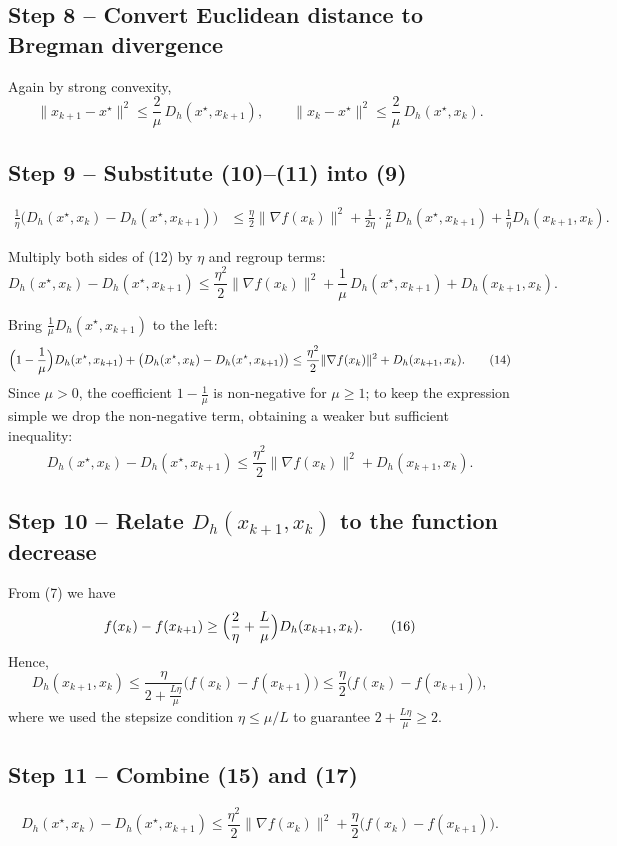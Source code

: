 \documentclass{article}
\newcommand{\grad}{\nabla}
\newcommand{\Breg}{D_h}
\begin{document}
\subsection*{Step 8 – Convert Euclidean distance to Bregman divergence}
Again by strong convexity,
\[
\|x_{k+1}-x^\star\|^{2}\le\frac{2}{\mu}\,\Breg(x^\star,x_{k+1}),
\qquad
\|x_{k}-x^\star\|^{2}\le\frac{2}{\mu}\,\Breg(x^\star,x_{k}).
\tag{11}
\]

\subsection*{Step 9 – Substitute (10)–(11) into (9)}
\[
\begin{aligned}
\frac{1}{\eta}\bigl(\Breg(x^\star,x_k)-\Breg(x^\star,x_{k+1})\bigr)
&\le
\frac{\eta}{2}\|\grad f(x_k)\|^{2}
   +\frac{1}{2\eta}\cdot\frac{2}{\mu}\,\Breg(x^\star,x_{k+1})
   +\frac{1}{\eta}\Breg(x_{k+1},x_k) .
\end{aligned}
\tag{12}
\]

Multiply both sides of (12) by $\eta$ and regroup terms:
\[
\Breg(x^\star,x_k)-\Breg(x^\star,x_{k+1})
\le
\frac{\eta^{2}}{2}\|\grad f(x_k)\|^{2}
   +\frac{1}{\mu}\,\Breg(x^\star,x_{k+1})
   +\Breg(x_{k+1},x_k).
\tag{13}
\]

Bring $\frac{1}{\mu}\Breg(x^\star,x_{k+1})$ to the left:
\[
\Bigl(1-\frac{1}{\mu}\Bigr)\Breg(x^\star,x_{k+1})
+\bigl(\Breg(x^\star,x_k)-\Breg(x^\star,x_{k+1})\bigr)
\le
\frac{\eta^{2}}{2}\|\grad f(x_k)\|^{2}
   +\Breg(x_{k+1},x_k).
\tag{14}
\]
Since $\mu>0$, the coefficient $1-\frac{1}{\mu}$ is non‑negative for $\mu\ge1$;
to keep the expression simple we drop the non‑negative term, obtaining a
weaker but sufficient inequality:
\[
\Breg(x^\star,x_k)-\Breg(x^\star,x_{k+1})
\le
\frac{\eta^{2}}{2}\|\grad f(x_k)\|^{2}
   +\Breg(x_{k+1},x_k).
\tag{15}
\]

\subsection*{Step 10 – Relate $\Breg(x_{k+1},x_k)$ to the function decrease}
From (7) we have
\[
f(x_k)-f(x_{k+1})\ge
\Bigl(\frac{2}{\eta}+\frac{L}{\mu}\Bigr)\Breg(x_{k+1},x_k).
\tag{16}
\]
Hence,
\[
\Breg(x_{k+1},x_k)\le
\frac{\eta}{2+ \tfrac{L\eta}{\mu}}\bigl(f(x_k)-f(x_{k+1})\bigr)
\le
\frac{\eta}{2}\bigl(f(x_k)-f(x_{k+1})\bigr),
\tag{17}
\]
where we used the stepsize condition $\eta\le\mu/L$ to guarantee
$2+\tfrac{L\eta}{\mu}\ge2$.

\subsection*{Step 11 – Combine (15) and (17)}
\[
\Breg(x^\star,x_k)-\Breg(x^\star,x_{k+1})
\le
\frac{\eta^{2}}{2}\|\grad f(x_k)\|^{2}
   +\frac{\eta}{2}\bigl(f(x_k)-f(x_{k+1})\bigr).
\tag{18}
\]
\end{document}
